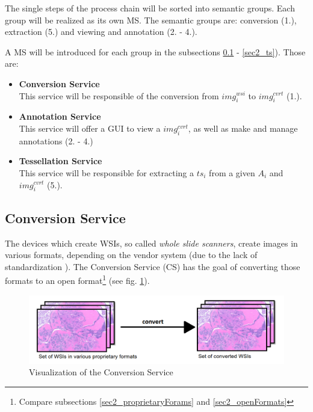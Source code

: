 The single steps of the process chain will be sorted into semantic groups. Each group will be realized as its own MS. The semantic groups are: conversion (1.), extraction (5.) and viewing and annotation (2. - 4.).

A MS will be introduced for each group in the subsections \ref{sec2_cs} - \ref{sec2_ts}). Those are:

\begin{itemize}
	\item \textbf{Conversion Service}\\
	This service will be responsible of the conversion from $img^{wsi}_i$ to $img^{cvrt}_i$ (1.).
	\item \textbf{Annotation Service}\\
	This service will offer a GUI to view a $img^{cvrt}_i$, as well as make and manage annotations (2. - 4.)
	\item \textbf{Tessellation Service}\\
	This service will be responsible for extracting a $ts_i$ from a given $A_i$ and $img^{cvrt}_i$ (5.).
\end{itemize}


\subsection{Conversion Service}
\label{sec2_cs}
The devices which create WSIs, so called \emph{whole slide scanners}, create images in various formats, depending on the vendor system (due to the lack of standardization \cite{Cornish13}). The Conversion Service (CS) has the goal of converting those formats to an open format\footnote{Compare subsections \ref{sec2_proprietaryForams} and \ref{sec2_openFormats}} (see fig. \ref{fig2_processChainA}).

\begin{figure}[H]
	\begin{center}
		\includegraphics[scale=0.35]{img/processChainA.png}
		\caption{Visualization of the Conversion Service}
		\label{fig2_processChainA}
	\end{center}
\end{figure}

